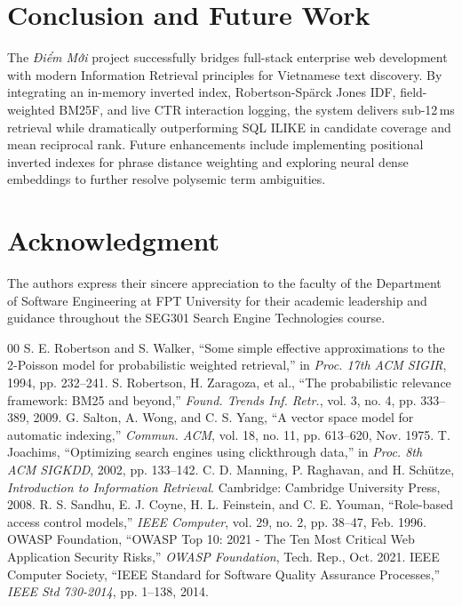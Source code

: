 \documentclass[conference]{IEEEtran}
\begin{document}
\section{Conclusion and Future Work}
The \textit{Điểm Mới} project successfully bridges full-stack enterprise web development with modern Information Retrieval principles for Vietnamese text discovery. By integrating an in-memory inverted index, Robertson-Spärck Jones IDF, field-weighted BM25F, and live CTR interaction logging, the system delivers sub-12\,ms retrieval while dramatically outperforming SQL ILIKE in candidate coverage and mean reciprocal rank. Future enhancements include implementing positional inverted indexes for phrase distance weighting and exploring neural dense embeddings to further resolve polysemic term ambiguities.

\section*{Acknowledgment}
The authors express their sincere appreciation to the faculty of the Department of Software Engineering at FPT University for their academic leadership and guidance throughout the SEG301 Search Engine Technologies course.

\begin{thebibliography}{00}
 S. E. Robertson and S. Walker, ``Some simple effective approximations to the 2-Poisson model for probabilistic weighted retrieval,'' in \textit{Proc. 17th ACM SIGIR}, 1994, pp. 232--241.
 S. Robertson, H. Zaragoza, et al., ``The probabilistic relevance framework: BM25 and beyond,'' \textit{Found. Trends Inf. Retr.}, vol. 3, no. 4, pp. 333--389, 2009.
 G. Salton, A. Wong, and C. S. Yang, ``A vector space model for automatic indexing,'' \textit{Commun. ACM}, vol. 18, no. 11, pp. 613--620, Nov. 1975.
 T. Joachims, ``Optimizing search engines using clickthrough data,'' in \textit{Proc. 8th ACM SIGKDD}, 2002, pp. 133--142.
 C. D. Manning, P. Raghavan, and H. Schütze, \textit{Introduction to Information Retrieval}. Cambridge: Cambridge University Press, 2008.
 R. S. Sandhu, E. J. Coyne, H. L. Feinstein, and C. E. Youman, ``Role-based access control models,'' \textit{IEEE Computer}, vol. 29, no. 2, pp. 38--47, Feb. 1996.
 OWASP Foundation, ``OWASP Top 10: 2021 - The Ten Most Critical Web Application Security Risks,'' \textit{OWASP Foundation}, Tech. Rep., Oct. 2021.
 IEEE Computer Society, ``IEEE Standard for Software Quality Assurance Processes,'' \textit{IEEE Std 730-2014}, pp. 1--138, 2014.
\end{thebibliography}
\end{document}
